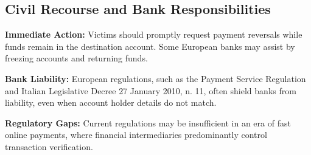 \subsection{Civil Recourse and Bank Responsibilities}
\textbf{Immediate Action:} Victims should promptly request payment reversals while funds remain in the destination account. Some European banks may assist by freezing accounts and returning funds.

\textbf{Bank Liability:} European regulations, such as the Payment Service Regulation and Italian Legislative Decree 27 January 2010, n. 11, often shield banks from liability, even when account holder details do not match.

\textbf{Regulatory Gaps:} Current regulations may be insufficient in an era of fast online payments, where financial intermediaries predominantly control transaction verification.
